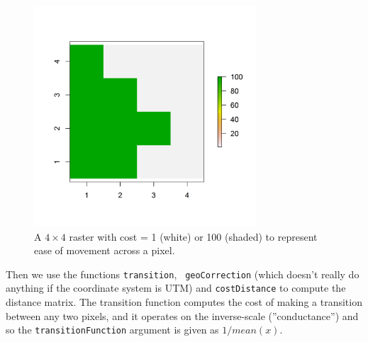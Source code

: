 \begin{figure}
\begin{center}
\includegraphics[height=3.25in,width=3.25in]{Ch10/figs/raster_2values}
\end{center}
\caption{A $4 \times 4$ raster with cost = 1 (white) or 100 (shaded) to represent ease of movement across a pixel.}
\label{ecoldist.fig.raster}
\end{figure}

Then we use the functions \mbox{\tt transition}, \mbox{\tt
  geoCorrection} (which doesn't really do anything if the coordinate system
  is UTM)
 and \mbox{\tt costDistance} to compute the distance
matrix. The transition function computes the cost of making a transition between
any two pixels, and it operates on the inverse-scale (''conductance'') and so the
\mbox{\tt transitionFunction} argument is given as $1/mean(x)$. 

